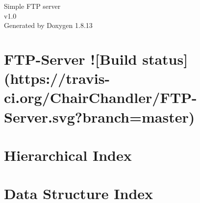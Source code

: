 \documentclass[twoside]{book}
\newcommand{\+}{\discretionary{\mbox{\scriptsize$\hookleftarrow$}}{}{}}
\newcommand{\clearemptydoublepage}{%
  \newpage{\pagestyle{empty}\cleardoublepage}%
}
\begin{document}
\hypersetup{pageanchor=false,
             bookmarksnumbered=true,
             pdfencoding=unicode
            }
\begin{titlepage}
\vspace*{7cm}
\begin{center}%
{\Large Simple F\+TP server \\[1ex]\large v1.\+0 }\\
\vspace*{1cm}
{\large Generated by Doxygen 1.8.13}\\
\end{center}
\end{titlepage}
\clearemptydoublepage
{}
\tableofcontents
\clearemptydoublepage
{}
\hypersetup{pageanchor=true}

\chapter{F\+T\+P-\/\+Server !\mbox{[}Build status\mbox{]}(https\+://travis-\/ci.org/\+Chair\+Chandler/\+F\+T\+P-\/\+Server.svg?branch=master)}
\label{md_README}

\chapter{Hierarchical Index}

\chapter{Data Structure Index}

\end{document}
